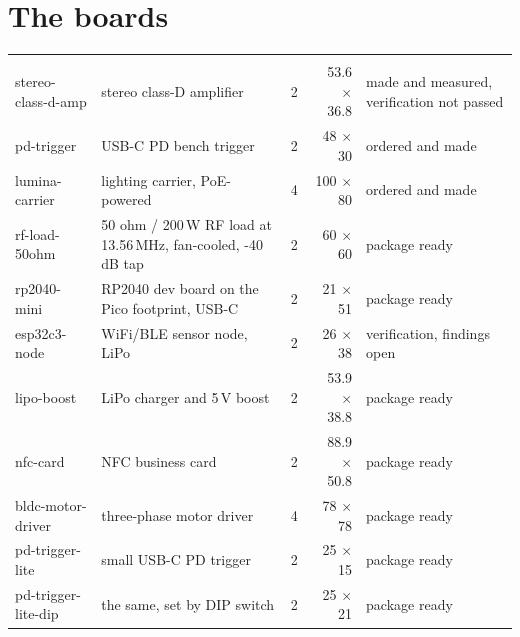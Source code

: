 
\section{The boards}

\begin{hsblock}
\par\vspace{8pt}
\footnotesize
\begin{tabularx}{\linewidth}{@{}l Y r r >{\raggedright\arraybackslash}p{3.3cm}@{}}
\hstoprule
{} &  &  &  & \\
\hstoprule
stereo-class-d-amp & stereo class-D amplifier & 2 & 53.6 $\times$ 36.8 & made and measured, verification not passed\\\hline
pd-trigger & USB-C PD bench trigger & 2 & 48 $\times$ 30 & ordered and made\\\hline
lumina-carrier & lighting carrier, PoE-powered & 4 & 100 $\times$ 80 & ordered and made\\\hline
rf-load-50ohm & 50 ohm / 200\,W RF load at 13.56\,MHz, fan-cooled, -40 dB tap & 2 & 60 $\times$ 60 & package ready\\\hline
rp2040-mini & RP2040 dev board on the Pico footprint, USB-C & 2 & 21 $\times$ 51 & package ready\\\hline
esp32c3-node & WiFi/BLE sensor node, LiPo & 2 & 26 $\times$ 38 & verification, findings open\\\hline
lipo-boost & LiPo charger and 5\,V boost & 2 & 53.9 $\times$ 38.8 & package ready\\\hline
nfc-card & NFC business card & 2 & 88.9 $\times$ 50.8 & package ready\\\hline
bldc-motor-driver & three-phase motor driver & 4 & 78 $\times$ 78 & package ready\\\hline
pd-trigger-lite & small USB-C PD trigger & 2 & 25 $\times$ 15 & package ready\\\hline
pd-trigger-lite-dip & the same, set by DIP switch & 2 & 25 $\times$ 21 & package ready\\\hline

\end{tabularx}
\end{hsblock}
